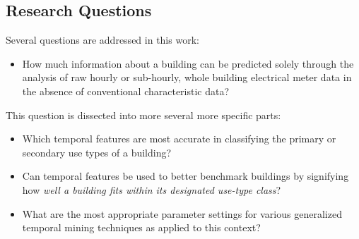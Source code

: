 \subsection{Research Questions}
Several questions are addressed in this work:
\begin{itemize}
\item How much information about a building can be predicted solely through the analysis of raw hourly or sub-hourly, whole building electrical meter data in the absence of conventional characteristic data? 
\end{itemize}
This question is dissected into more several more specific parts:
\begin{itemize}
\item Which temporal features are most accurate in classifying the primary or secondary use types of a building?
\item Can temporal features be used to better benchmark buildings by signifying how \emph{well a building fits within its designated use-type class}?
\item What are the most appropriate parameter settings for various generalized temporal mining techniques as applied to this context?
\end{itemize}






